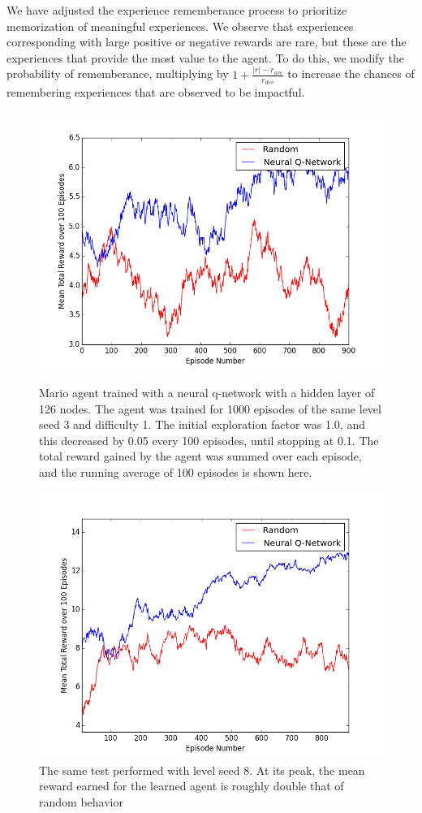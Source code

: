 \documentclass{article}
\begin{document}
We have adjusted the experience rememberance process to prioritize memorization of meaningful experiences. We observe that experiences corresponding with large positive or negative rewards are rare, but these are the experiences that provide the most value to the agent. To do this, we modify the probability of rememberance, multiplying by $1 + \frac{|r| - r_{ave}}{r_{dev}}$ to increase the chances of remembering experiences that are observed to be impactful.

 \begin{figure}
 \begin{center}
\includegraphics[scale=0.42]{seed3.png}
\caption{Mario agent trained with a neural q-network with a hidden layer of 126 nodes. The agent was trained for 1000 episodes of the same level seed 3 and difficulty 1. The initial exploration factor was 1.0, and this decreased by 0.05 every 100 episodes, until stopping at 0.1. The total reward gained by the agent was summed over each episode, and the running average of 100 episodes is shown here.}
\includegraphics[scale=0.42]{seed8.png}
\caption{The same test performed with level seed 8. At its peak, the mean reward earned for the learned agent is roughly double that of random behavior}
\end{center}
\end{figure}
\end{document}
